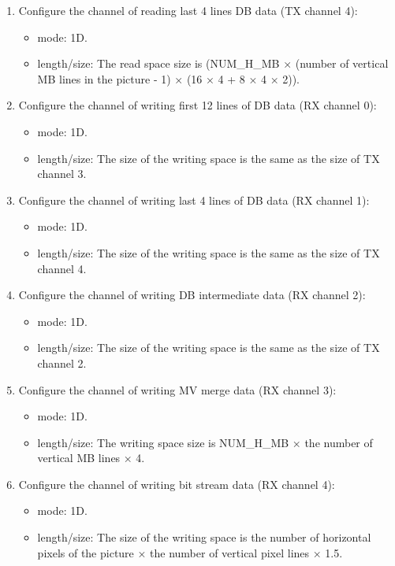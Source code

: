 \documentclass[main\_\_EN.tex]{subfiles}
\begin{document}
\begin{enumerate}
    \item Configure the channel of reading last 4 lines DB data (TX channel 4):
    \begin{itemize}
        \item mode: 1D.
        \item length/size: The read space size is (NUM\_H\_MB × (number of vertical MB lines in the picture - 1) × (16 × 4 + 8 × 4 × 2)).
    \end{itemize}
    \item Configure the channel of writing first 12 lines of DB data (RX channel 0):
    \begin{itemize}
        \item mode: 1D.
        \item length/size: The size of the writing space is the same as the size of TX channel 3.
    \end{itemize}
    \item Configure the channel of writing last 4 lines of DB data (RX channel 1):
    \begin{itemize}
        \item mode: 1D.
        \item length/size: The size of the writing space is the same as the size of TX channel 4.
    \end{itemize}
    \item Configure the channel of writing DB intermediate data (RX channel 2):
    \begin{itemize}
        \item mode: 1D.
        \item length/size: The size of the writing space is the same as the size of TX channel 2.
    \end{itemize}
    \item Configure the channel of writing MV merge data (RX channel 3):
    \begin{itemize}
        \item mode: 1D.
        \item length/size: The writing space size is NUM\_H\_MB × the number of vertical MB lines × 4.
    \end{itemize}
    \item Configure the channel of writing bit stream data (RX channel 4):
    \begin{itemize}
        \item mode: 1D.
        \item length/size: The size of the writing space is the number of horizontal pixels of the picture × the number of vertical pixel lines × 1.5.
    \end{itemize}
\end{enumerate}
\end{document}
